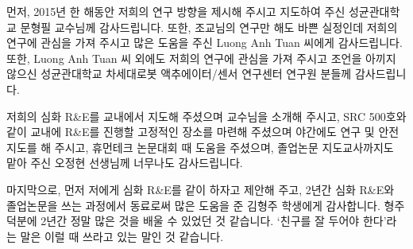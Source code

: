 \clearpage
\begin{onehalfspace} %
	
	
\end{onehalfspace}



\begin{acknowledgements}

먼저, 2015년 한 해동안 저희의 연구 방향을 제시해 주시고 지도하여 주신 성균관대학교 문형필 교수님께 감사드립니다. 또한, 조교님의 연구만 해도 바쁜 실정인데 저희의 연구에 관심을 가져 주시고 많은 도움을 주신 Luong Anh Tuan 씨에게 감사드립니다. 또한, Luong Anh Tuan 씨 외에도 저희의 연구에 관심을 가져 주시고 조언을 아끼지 않으신 성균관대학교 차세대로봇 액추에이터/센서 연구센터 연구원 분들께 감사드립니다.

저희의 심화 R\&E를 교내에서 지도해 주셨으며 교수님을 소개해 주시고, SRC 500호와 같이 교내에 R\&E를 진행할 고정적인 장소를 마련해 주셨으며 야간에도 연구 및 안전 지도를 해 주시고, 휴먼테크 논문대회 때 도움을 주셨으며, 졸업논문 지도교사까지도 맡아 주신 오정현 선생님께 너무나도  감사드립니다.

마지막으로, 먼저 저에게 심화 R\&E를 같이 하자고 제안해 주고, 2년간 심화 R\&E와 졸업논문을 쓰는 과정에서 동료로써 많은 도움을 준 김형주 학생에게 감사합니다. 형주 덕분에 2년간 정말 많은 것을 배울 수 있었던 것 같습니다. `친구를 잘 두어야 한다'라는 말은 이럴 때 쓰라고 있는 말인 것 같습니다.
\end{acknowledgements}

